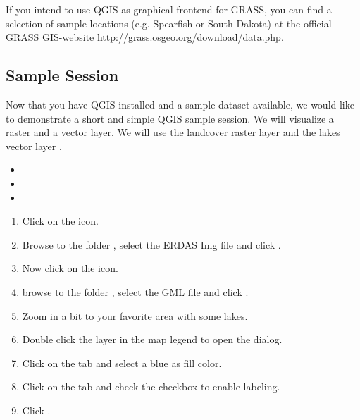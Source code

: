 If you intend to use QGIS as graphical frontend for GRASS, you can find a
selection of sample locations (e.g. Spearfish or South Dakota) at the
official GRASS GIS-website \url{http://grass.osgeo.org/download/data.php}. 

\subsection{Sample Session}\label{samplesession}

Now that you have QGIS installed and a sample dataset available, we would 
like to demonstrate a short and simple QGIS sample session. We will visualize 
a raster and a vector layer. We will use the landcover raster 
layer  and the lakes 
vector layer .


\begin{itemize}
\item {}
\item {}
\item {}
\end{itemize} 


\begin{enumerate}
\item Click on the  icon.
\item Browse to the folder , select 
the ERDAS Img file  and click .
\item Now click on the  icon.
\item browse to the folder , select 
the GML file  and click .
\item Zoom in a bit to your favorite area with some lakes.
\item Double click the  layer in the map legend to open the 
 dialog.
\item Click on the  tab and select a blue as fill color.
\item Click on the  tab and check the  
checkbox to enable labeling.
\item Click .
\end{enumerate} 

